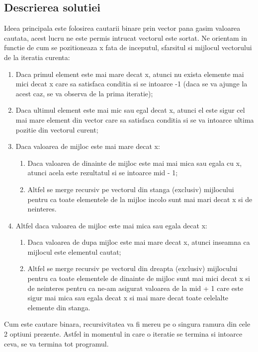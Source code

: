 \documentclass[runningheads]{llncs}
\begin{document}
\subsection{Descrierea solutiei}
Ideea principala este folosirea cautarii binare prin vector pana gasim valoarea cautata, acest lucru ne este permis
intrucat vectorul este sortat. Ne orientam in functie de cum se pozitioneaza x fata de inceputul, sfarsitul si mijlocul
vectorului de la iteratia curenta:
\begin{enumerate}
	\item Daca primul element este mai mare decat x, atunci nu exista elemente mai mici decat x care sa satisfaca conditia
si se intoarce -1 (daca se va ajunge la acest caz, se va observa de la prima iteratie);
	\item Daca ultimul element este mai mic sau egal decat x, atunci el este sigur cel mai mare element din vector care
sa satisfaca conditia si se va intoarce ultima pozitie din vectorul curent;
	\item Daca valoarea de mijloc este mai mare decat x:
	\begin{enumerate}
		\item Daca valoarea de dinainte de mijloc este mai mai mica sau egala cu x, atunci acela este rezultatul si se intoarce
mid - 1;
		\item Altfel se merge recursiv pe vectorul din stanga (exclusiv) mijlocului pentru ca toate elementele de la mijloc incolo
sunt mai mari decat x si de neinteres.
	\end{enumerate}
	\item Altfel daca valoarea de mijloc este mai mica sau egala decat x:
	\begin{enumerate}
		\item Daca valoarea de dupa mijloc este mai mare decat x, atunci inseamna ca mijlocul este elementul cautat;
		\item Altfel se merge recursiv pe vectorul din dreapta (exclusiv) mijlocului pentru ca toate elementele de dinainte de
mijloc sunt mai mici decat x si de neinteres pentru ca ne-am asigurat valoarea de la mid + 1 care este sigur mai mica sau egala
decat x si mai mare decat toate celelalte elemente din stanga.
	\end{enumerate}
\end{enumerate}
Cum este cautare binara, recursivitatea va fi mereu pe o singura ramura din cele 2 optiuni prezente. Astfel in momentul in care
o iteratie se termina si intoarce ceva, se va termina tot programul.
\end{document}
